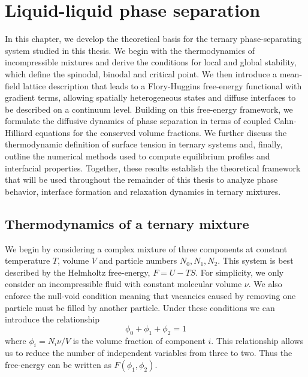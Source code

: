 \documentclass[12pt]{article}
\begin{document}
\section{Liquid-liquid phase separation}\label{s:theory}
In this chapter, we develop the theoretical basis for the ternary phase-separating system studied in this thesis. We begin with the thermodynamics of incompressible mixtures and derive the conditions for local and global stability, which define the spinodal, binodal and critical point. We then introduce a mean-field lattice description that leads to a Flory-Huggins free-energy functional with gradient terms, allowing spatially heterogeneous states and diffuse interfaces to be described on a continuum level. Building on this free-energy framework, we formulate the diffusive dynamics of phase separation in terms of coupled Cahn-Hilliard equations for the conserved volume fractions. We further discuss the thermodynamic definition of surface tension in ternary systems and, finally, outline the numerical methods used to compute equilibrium profiles and interfacial properties. Together, these results establish the theoretical framework that will be used throughout the remainder of this thesis to analyze phase behavior, interface formation and relaxation dynamics in ternary mixtures.
\subsection{Thermodynamics of a ternary mixture}\label{ss:thermodynamics}
We begin by considering a complex mixture of three components at constant temperature \(T\), volume \(V\) and particle numbers \(N_0, N_1, N_2\). This system is best described by the Helmholtz free-energy,
\(F=U-TS\).
For simplicity, we only consider an incompressible fluid with constant molecular volume \(\nu\).
We also enforce the null-void condition meaning that vacancies caused by removing one particle must be filled by another particle.
Under these conditions we can introduce the relationship
\begin{equation}
    \phi_0 + \phi_1 + \phi_2 = 1
    \label{eq:incompressibility}
\end{equation}
where \(\phi_i = N_i \nu/V\) is the volume fraction of component \(i\). This relationship allows us to reduce the number of independent variables from three to two.
Thus the free-energy can be written as \(F(\phi_1, \phi_2)\).
\end{document}
